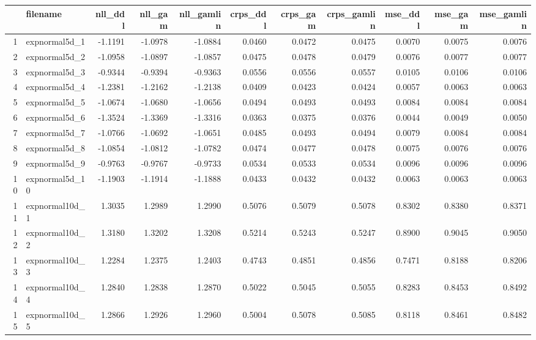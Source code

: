 \begin{table}[ht]
\centering
\begin{tabular}{rlrrrrrrrrr}
  \hline
 & filename & nll\_ddl & nll\_gam & nll\_gamlin & crps\_ddl & crps\_gam & crps\_gamlin & mse\_ddl & mse\_gam & mse\_gamlin \\ 
  \hline
1 & expnormal5d\_1      & -1.1191 & -1.0978 & -1.0884 & 0.0460 & 0.0472 & 0.0475 & 0.0070 & 0.0075 & 0.0076 \\ 
  2 & expnormal5d\_2    & -1.0958 & -1.0897 & -1.0857 & 0.0475 & 0.0478 & 0.0479 & 0.0076 & 0.0077 & 0.0077 \\ 
  3 & expnormal5d\_3    & -0.9344 & -0.9394 & -0.9363 & 0.0556 & 0.0556 & 0.0557 & 0.0105 & 0.0106 & 0.0106 \\ 
  4 & expnormal5d\_4    & -1.2381 & -1.2162 & -1.2138 & 0.0409 & 0.0423 & 0.0424 & 0.0057 & 0.0063 & 0.0063 \\ 
  5 & expnormal5d\_5    & -1.0674 & -1.0680 & -1.0656 & 0.0494 & 0.0493 & 0.0493 & 0.0084 & 0.0084 & 0.0084 \\ 
  6 & expnormal5d\_6    & -1.3524 & -1.3369 & -1.3316 & 0.0363 & 0.0375 & 0.0376 & 0.0044 & 0.0049 & 0.0050 \\ 
  7 & expnormal5d\_7    & -1.0766 & -1.0692 & -1.0651 & 0.0485 & 0.0493 & 0.0494 & 0.0079 & 0.0084 & 0.0084 \\ 
  8 & expnormal5d\_8    & -1.0854 & -1.0812 & -1.0782 & 0.0474 & 0.0477 & 0.0478 & 0.0075 & 0.0076 & 0.0076 \\ 
  9 & expnormal5d\_9    & -0.9763 & -0.9767 & -0.9733 & 0.0534 & 0.0533 & 0.0534 & 0.0096 & 0.0096 & 0.0096 \\ 
  10 & expnormal5d\_10  & -1.1903 & -1.1914 & -1.1888 & 0.0433 & 0.0432 & 0.0432 & 0.0063 & 0.0063 & 0.0063 \\ 
  11 & expnormal10d\_1  & 1.3035 & 1.2989 & 1.2990 & 0.5076 & 0.5079 & 0.5078 & 0.8302 & 0.8380 & 0.8371 \\ 
  12 & expnormal10d\_2  & 1.3180 & 1.3202 & 1.3208 & 0.5214 & 0.5243 & 0.5247 & 0.8900 & 0.9045 & 0.9050 \\ 
  13 & expnormal10d\_3  & 1.2284 & 1.2375 & 1.2403 & 0.4743 & 0.4851 & 0.4856 & 0.7471 & 0.8188 & 0.8206 \\ 
  14 & expnormal10d\_4  & 1.2840 & 1.2838 & 1.2870 & 0.5022 & 0.5045 & 0.5055 & 0.8283 & 0.8453 & 0.8492 \\ 
  15 & expnormal10d\_5  & 1.2866 & 1.2926 & 1.2960 & 0.5004 & 0.5078 & 0.5085 & 0.8118 & 0.8461 & 0.8482 \\ 

\end{tabular}
\end{table}
